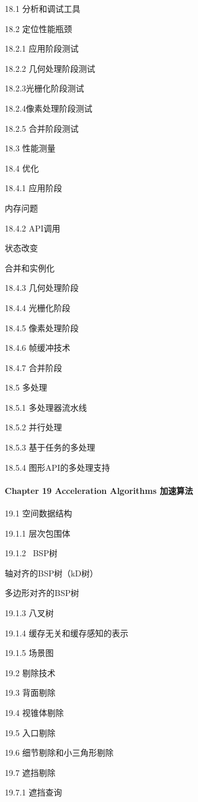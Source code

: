 \documentclass[
  paper=a4,
  ,captions=tableheading
]{scrartcl}
\begin{document}
18.1 分析和调试工具

18.2 定位性能瓶颈

18.2.1 应用阶段测试

18.2.2 几何处理阶段测试

18.2.3光栅化阶段测试

18.2.4像素处理阶段测试

18.2.5 合并阶段测试

18.3 性能测量

18.4 优化

18.4.1 应用阶段

内存问题

18.4.2 API调用

状态改变

合并和实例化

18.4.3 几何处理阶段

18.4.4 光栅化阶段

18.4.5 像素处理阶段

18.4.6 帧缓冲技术

18.4.7 合并阶段

18.5 多处理

18.5.1 多处理器流水线

18.5.2 并行处理

18.5.3 基于任务的多处理

18.5.4 图形API的多处理支持

\paragraph{Chapter 19 Acceleration Algorithms
加速算法}\label{chapter-19-acceleration-algorithms-ux52a0ux901fux7b97ux6cd5}

19.1 空间数据结构

19.1.1 层次包围体

19.1.2 ~BSP树

轴对齐的BSP树（kD树）

多边形对齐的BSP树

19.1.3 八叉树

19.1.4 缓存无关和缓存感知的表示

19.1.5 场景图

19.2 剔除技术

19.3 背面剔除

19.4 视锥体剔除

19.5 入口剔除

19.6 细节剔除和小三角形剔除

19.7 遮挡剔除

19.7.1 遮挡查询
\end{document}
